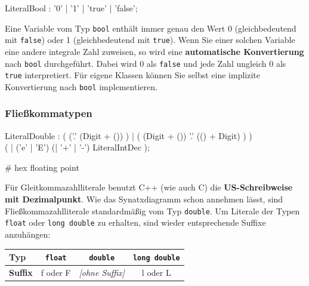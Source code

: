 \documentclass[a4paper]{report}
\begin{document}
\begin{multicols}{2}
	\begin{rail}
		LiteralBool : '0' | '1' | 'true' | 'false';
	\end{rail}

Eine Variable vom Typ \texttt{bool} enthält immer genau den Wert 0 (gleichbedeutend mit \texttt{false}) oder 1 (gleichbedeutend mit \texttt{true}). Wenn Sie einer solchen Variable eine andere integrale Zahl zuweisen, so wird eine \textbf{automatische Konvertierung} nach \texttt{bool} durchgeführt. Dabei wird 0 als \texttt{false} und jede Zahl ungleich 0 als \texttt{true} interpretiert. Für eigene Klassen können Sie selbst eine implizite Konvertierung nach \texttt{bool} implementieren. %
\end{multicols}

\subsubsection{Fließkommatypen}


\begin{rail}
	LiteralDouble : (
						('.' 
							(Digit + ())
						) |
						(
							(Digit + ())
							'.' (() + Digit)
						)
					) \\
					( | 
						('e' | 'E') 
						(| '+' | '-') 
						LiteralIntDec
					);
\end{rail}

\# hex floating point

Für Gleitkommazahlliterale benutzt C++ (wie auch C) die \textbf{US-Schreibweise mit Dezimalpunkt}. Wie das Synatxdiagramm schon annehmen lässt, sind Fließkommazahlliterale standardmäßig vom Typ \texttt{double}. Um Literale der Typen \texttt{float} oder \texttt{long double} zu erhalten, sind wieder entsprechende Suffixe anzuhängen:
\begin{center}
\begin{tabular}{|l|c|c|c|} \hline
	\textbf{Typ} & \texttt{float} & \texttt{double} & \texttt{long double} \\ \hline
	\textbf{Suffix} & f oder F & \textit{[ohne Suffix]} & l oder L \\ \hline
\end{tabular}
\end{center}

\end{document}
